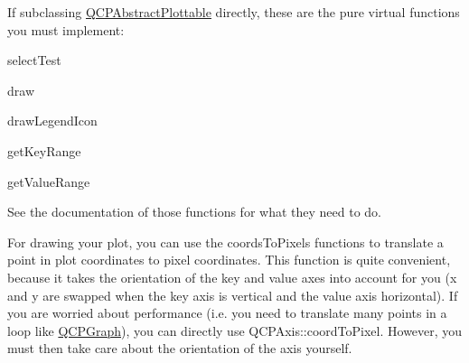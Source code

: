 If subclassing \mbox{\hyperlink{class_q_c_p_abstract_plottable}{Q\+C\+P\+Abstract\+Plottable}} directly, these are the pure virtual functions you must implement\+: \begin{DoxyItemize}
\item select\+Test \item draw \item draw\+Legend\+Icon \item get\+Key\+Range \item get\+Value\+Range\end{DoxyItemize}
See the documentation of those functions for what they need to do.

For drawing your plot, you can use the coords\+To\+Pixels functions to translate a point in plot coordinates to pixel coordinates. This function is quite convenient, because it takes the orientation of the key and value axes into account for you (x and y are swapped when the key axis is vertical and the value axis horizontal). If you are worried about performance (i.\+e. you need to translate many points in a loop like \mbox{\hyperlink{class_q_c_p_graph}{Q\+C\+P\+Graph}}), you can directly use Q\+C\+P\+Axis\+::coord\+To\+Pixel. However, you must then take care about the orientation of the axis yourself.


